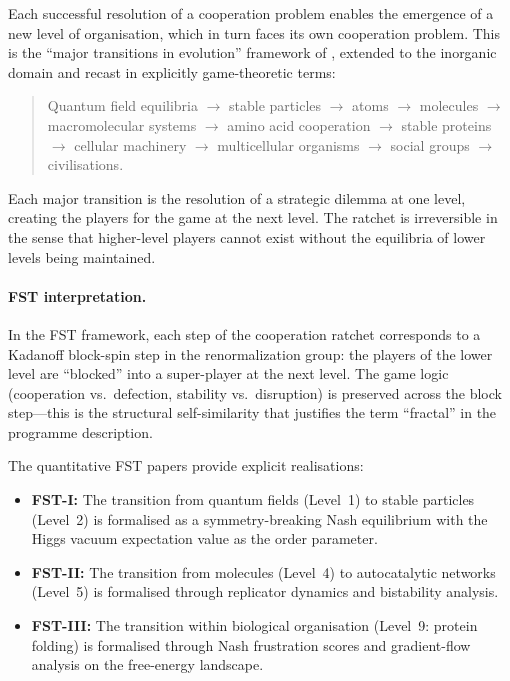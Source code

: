 \documentclass[12pt,a4paper]{article}
\theoremstyle{remark}
\begin{document}
Each successful resolution of a cooperation problem enables the emergence of a new level of organisation, which in turn faces its own cooperation problem. This is the ``major transitions in evolution'' framework of \citet{MaynardSmith1995}, extended to the inorganic domain and recast in explicitly game-theoretic terms:

\begin{quote}
Quantum field equilibria $\to$ stable particles $\to$ atoms $\to$ molecules $\to$ macromolecular systems $\to$ amino acid cooperation $\to$ stable proteins $\to$ cellular machinery $\to$ multicellular organisms $\to$ social groups $\to$ civilisations.
\end{quote}

Each major transition is the resolution of a strategic dilemma at one level, creating the players for the game at the next level. The ratchet is irreversible in the sense that higher-level players cannot exist without the equilibria of lower levels being maintained.

\paragraph{FST interpretation.}
In the FST framework, each step of the cooperation ratchet corresponds to a Kadanoff block-spin step in the renormalization group: the players of the lower level are ``blocked'' into a super-player at the next level. The game logic (cooperation vs.\ defection, stability vs.\ disruption) is preserved across the block step---this is the structural self-similarity that justifies the term ``fractal'' in the programme description.

The quantitative FST papers provide explicit realisations:
\begin{itemize}[leftmargin=2em]
  \item \textbf{FST-I:} The transition from quantum fields (Level~1) to stable particles (Level~2) is formalised as a symmetry-breaking Nash equilibrium with the Higgs vacuum expectation value as the order parameter.
  \item \textbf{FST-II:} The transition from molecules (Level~4) to autocatalytic networks (Level~5) is formalised through replicator dynamics and bistability analysis.
  \item \textbf{FST-III:} The transition within biological organisation (Level~9: protein folding) is formalised through Nash frustration scores and gradient-flow analysis on the free-energy landscape.
\end{itemize}
\end{document}
